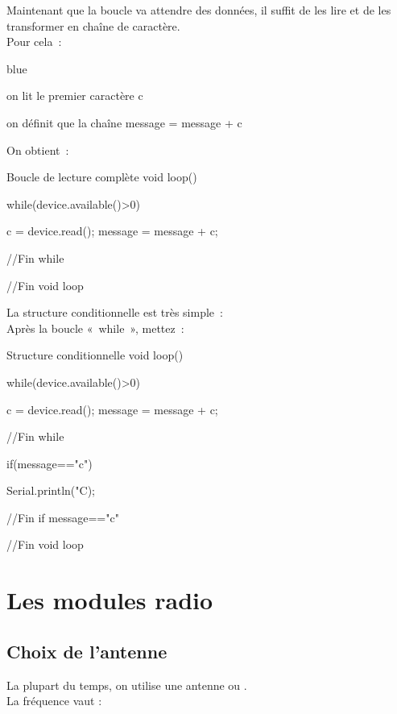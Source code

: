 Maintenant que la boucle va attendre des données, il suffit de les lire et de les transformer en chaîne de caractère. \\
Pour cela : \\

\begin{items}{blue}{\Triangle}
    \item on lit le premier caractère c
    \item on définit que la chaîne message = message + c 
\end{items}
On obtient :

\begin{Cpp}{Boucle de lecture complète}
 void loop() {
 
    while(device.available()>0) {
    
        c = device.read();
        message = message + c;
    }//Fin while

 }//Fin void loop

\end{Cpp}

La structure conditionnelle est très simple : \\
Après la boucle « while », mettez : \\

\begin{Cpp}{Structure conditionnelle}
 void loop() {
 
    while(device.available()>0) {
    
        c = device.read();
        message = message + c;
    }//Fin while
    
    if(message=="c") {
    
        Serial.println("C);
    }//Fin if message=="c"

 }//Fin void loop

\end{Cpp}

\section{Les modules radio }


\subsection{Choix de l'antenne}

La plupart du temps, on utilise une antenne  ou .\\
La fréquence vaut :

